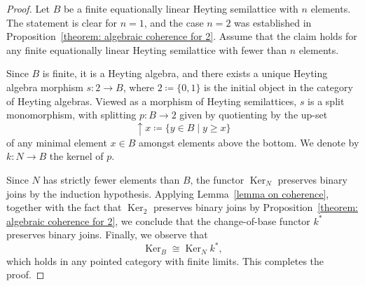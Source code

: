 \documentclass[reqno,a4paper]{amsart}
\theoremstyle{remark}
\theoremstyle{definition}
\newcommand{\ua}{{\uparrow}}
\DeclareMathOperator{\Ker}{Ker}
\begin{document}
\begin{proof}
	Let \(B\) be a finite equationally linear Heyting semilattice with \(n\) elements.
	The statement is clear for \(n=1\), and the case \(n=2\) was established in
	Proposition~\ref{theorem: algebraic coherence for 2}.
	Assume that the claim holds for any finite equationally linear Heyting semilattice
	with fewer than \(n\) elements.

	Since \(B\) is finite, it is a Heyting algebra, and there exists a unique Heyting
	algebra morphism \(s\colon 2 \to B\), where \(2 \coloneq \{0,1\}\) is the initial object
	in the category of Heyting algebras.
	Viewed as a morphism of Heyting semilattices, \(s\) is a split monomorphism, with
	splitting \(p\colon B \to 2\) given by quotienting by the up-set
	\[
		\ua{x} \coloneq \{ y \in B \mid y \ge x \}
	\]
	of any minimal element \(x \in B\) amongst elements above the bottom.
	We denote by \(k\colon N \to B\) the kernel of \(p\).

	Since \(N\) has strictly fewer elements than \(B\), the functor \(\Ker_N\) preserves
	binary joins by the induction hypothesis.
	Applying Lemma~\ref{lemma on coherence}, together with the fact that \(\Ker_2\)
	preserves binary joins by Proposition~\ref{theorem: algebraic coherence for 2}, we
	conclude that the change-of-base functor \(k^*\) preserves binary joins.
	Finally, we observe that
	\[
		\Ker_B \cong \Ker_N  k^*,
	\]
	which holds in any pointed category with finite limits. This completes the proof.
\end{proof}
\end{document}
